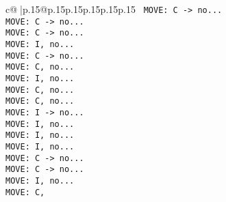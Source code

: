 \documentclass{article}
\begin{document}
{\begin{supertabular}{c@{$\;$}|p{.15\linewidth}@{}p{.15\linewidth}p{.15\linewidth}p{.15\linewidth}p{.15\linewidth}p{.15\linewidth}}
{{{\ \tt  MOVE: C -> no...\\ \tt  MOVE: C -> no...\\ \tt  MOVE: C -> no...\\ \tt  MOVE: I, no...\\ \tt  MOVE: C -> no...\\ \tt  MOVE: C, no...\\ \tt  MOVE: I, no...\\ \tt  MOVE: C, no...\\ \tt  MOVE: C, no...\\ \tt  MOVE: I -> no...\\ \tt  MOVE: I, no...\\ \tt  MOVE: I, no...\\ \tt  MOVE: I, no...\\ \tt  MOVE: C -> no...\\ \tt  MOVE: C -> no...\\ \tt  MOVE: I, no...\\ \tt  MOVE: C,}}}
\end{supertabular}}
\end{document}

